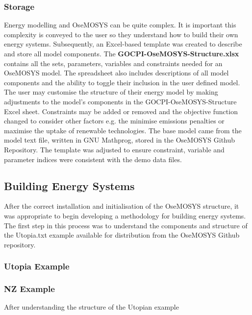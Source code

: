 \documentclass[12pt]{article}
\begin{document}
\subsubsection{Storage}\label{OSTORAGE}
Energy modelling and OseMOSYS can be quite complex. It is important this complexity is conveyed to the user so they understand how to build their own energy systems.
Subsequently, an Excel-based template was created to describe and store all model components. The \textbf{GOCPI-OseMOSYS-Structure.xlsx} contains
all the sets, parameters, variables and constraints needed for an OseMOSYS model. The spreadsheet also includes descriptions of all model components
and the ability to toggle their inclusion in the user defined model. 
The user may customise the structure of their energy model by making adjustments to the model's components in the GOCPI-OseMOSYS-Structure Excel sheet.
Constraints may be added or removed and the objective function changed to consider other factors e.g. the minimise emissions penalties or maximise the uptake of renewable technologies.
The base model came from the model text file, written in GNU Mathprog, stored in the OseMOSYS Github Repository.
The template was adjusted to ensure constraint, variable and parameter indices were consistent with the demo data files.

\subsection{Building Energy Systems}\label{BES}
After the correct installation and initialisation of the OseMOSYS structure, 
it was appropriate to begin developing a methodology for building energy systems.
The first step in this process was to understand the components and structure of the Utopia.txt example available for distribution from the OseMOSYS Github repository.
\subsubsection{Utopia Example}
\subsubsection{NZ Example}
After understanding the structure of the Utopian example
\end{document}
